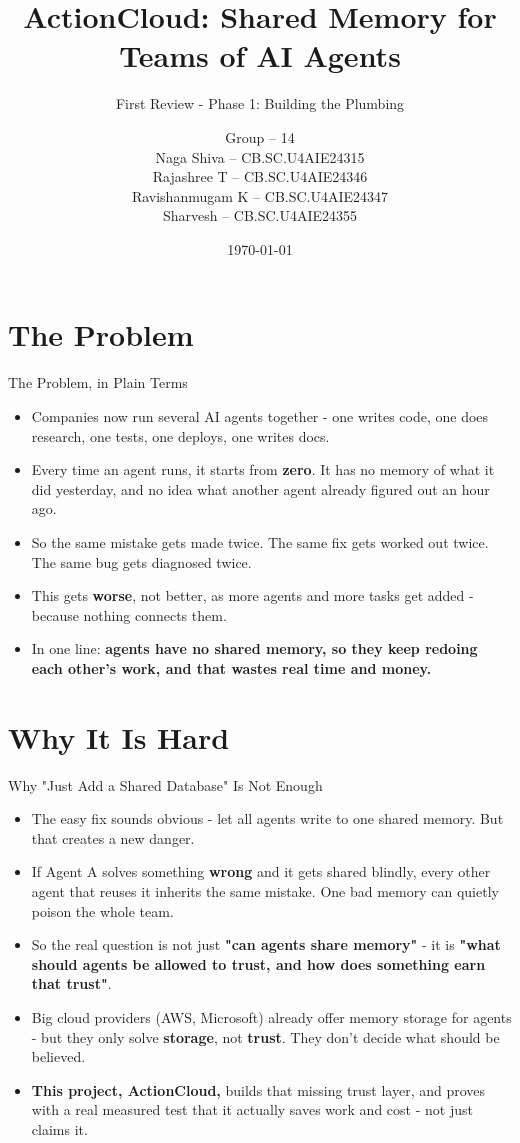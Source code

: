 \documentclass{beamer}
\title[ActionCloud]
{ActionCloud: Shared Memory for Teams of AI Agents}
\subtitle{First Review - Phase 1: Building the Plumbing}
\author[Group 14]
{
Group -- 14\\
Naga Shiva -- CB.SC.U4AIE24315\\
Rajashree T -- CB.SC.U4AIE24346\\
Ravishanmugam K -- CB.SC.U4AIE24347\\
Sharvesh -- CB.SC.U4AIE24355
}
\institute[Amrita Vishwa Vidyapeetham]
{
Amrita School of Artificial Intelligence, Amrita Vishwa Vidyapeetham, Coimbatore
}
\date{\today}
\begin{document}
\begin{frame}
  \titlepage
\end{frame}

\section{The Problem}
\begin{frame}{The Problem, in Plain Terms}
    \begin{itemize}
        \item Companies now run several AI agents together - one writes code, one does research, one tests, one deploys, one writes docs.
        \item Every time an agent runs, it starts from \textbf{zero}. It has no memory of what it did yesterday, and no idea what another agent already figured out an hour ago.
        \item So the same mistake gets made twice. The same fix gets worked out twice. The same bug gets diagnosed twice.
        \item This gets \textbf{worse}, not better, as more agents and more tasks get added - because nothing connects them.
        \item In one line: \textbf{agents have no shared memory, so they keep redoing each other's work, and that wastes real time and money.}
    \end{itemize}
\end{frame}

\section{Why It Is Hard}
\begin{frame}{Why "Just Add a Shared Database" Is Not Enough}
    \begin{itemize}
        \item The easy fix sounds obvious - let all agents write to one shared memory. But that creates a new danger.
        \item If Agent A solves something \textbf{wrong} and it gets shared blindly, every other agent that reuses it inherits the same mistake. One bad memory can quietly poison the whole team.
        \item So the real question is not just \textbf{"can agents share memory"} - it is \textbf{"what should agents be allowed to trust, and how does something earn that trust"}.
        \item Big cloud providers (AWS, Microsoft) already offer memory storage for agents - but they only solve \textbf{storage}, not \textbf{trust}. They don't decide what should be believed.
        \item \textbf{This project, ActionCloud,} builds that missing trust layer, and proves with a real measured test that it actually saves work and cost - not just claims it.
    \end{itemize}
\end{frame}
\end{document}
